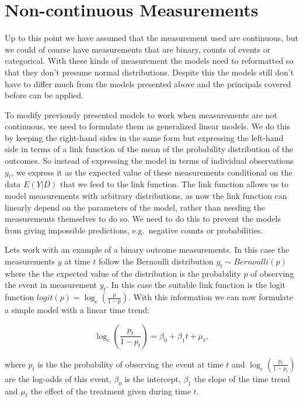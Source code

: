 \documentclass[12pt,a4paper,leqno]{report}
\theoremstyle{plain}
\theoremstyle{definition}
\theoremstyle{remark}
\begin{document}
\section{Non-continuous Measurements}\label{noncontinuous}

Up to this point we have assumed that the measurement used are continuous, but
we could of course have measurements that are binary, counts of events or
categorical. With these kinds of measurement the models need to reformatted so that
they don't presume normal distributions. Despite this the models still don't
have to differ much from the models presented above and the principals covered
before can be applied.

To modify previously presented models to work when measurements are not
continuous, we need to formulate them as generalized linear models. We do
this by keeping the right-hand sides in the same form but expressing the
left-hand side in terms of a link function of the mean of the probability
distribution of the outcomes. So instead of expressing the model in terms of
individual observations \(y_t\), we express it as the expected value of these
measurements conditional on the data \(E(Y|D)\) that we feed to the link
function. The link function allows us to model measurements with arbitrary
distributions, as now the link function can linearly depend on the parameters of
the model, rather than needing the measurements themselves to do so. We need to
do this to prevent the models from giving impossible predictions, e.g.\ negative
counts or probabilities.

Lets work with an example of a binary outcome measurements. In this case the
measurements \(y\) at time \(t\) follow the Bernoulli distribution \(y_t \sim
Bernoulli(p)\) where the the expected value of the distribution is the
probability \(p\) of observing the event in measurement \(y_t\). In this case
the suitable link function is the logit function
\(logit(p)=\log_e(\frac{p}{1-p})\). With this information we can now formulate a
simple model with a linear time trend:

\begin{def}\label{}
    \begin{equation}
        \log_e(\frac{p_t}{1-p_t})=\beta_0 + \beta_1 t + \mu_t,
    \end{equation}
\end{def}where \(p_t\) is the the probability of observing the event at time
\(t\) and \(\log_e(\frac{p_t}{1-p_t})\) are the log-odds of this event,
\(\beta_0\) is the intercept, \(\beta_1\) the slope of the time trend and
\(\mu_t\) the effect of the treatment given during time \(t\).
\end{document}
